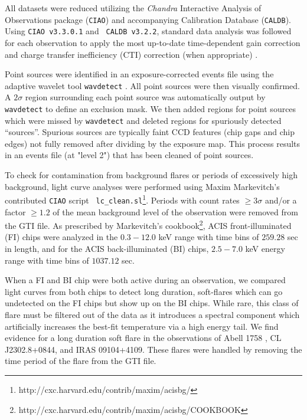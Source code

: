 \documentclass{emulateapj}
\begin{document}
All datasets were reduced utilizing the {\it Chandra} Interactive Analysis of
Observations package ({\tt CIAO}) and accompanying Calibration
Database ({\tt CALDB}). Using {\tt CIAO v3.3.0.1} and {\tt
CALDB v3.2.2}, standard data analysis was followed for each
observation to apply the most up-to-date time-dependent gain
correction and charge transfer inefficiency (CTI) correction (when
appropriate) \citep{2000ApJ...534L.139T}.

Point sources were identified in an exposure-corrected events file
using the adaptive wavelet tool {\tt wavdetect}
\citep{2002ApJS..138..185F}. All point sources were then visually
confirmed. A $2\sigma$ region surrounding each point source was
automatically output by {\tt wavdetect} to define an exclusion
mask. We then added regions for point sources which were missed by
{\tt wavdetect} and deleted regions for spuriously detected
``sources''. Spurious sources are typically faint CCD features (chip
gaps and chip edges) not fully removed after dividing by the exposure
map. This process results in an events file (at "level 2") that has
been cleaned of point sources.

To check for contamination from background flares or periods of
excessively high background, light curve analyses were performed using
Maxim Markevitch's contributed {\tt CIAO} script {\tt
lc\_clean.sl}\footnote{http://cxc.harvard.edu/contrib/maxim/acisbg/}.
Periods with count rates $\geq 3\sigma$ and/or a factor $\geq 1.2$ of
the mean background level of the observation were removed from the GTI
file. As prescribed by Markevitch's
cookbook\footnote{http://cxc.harvard.edu/contrib/maxim/acisbg/COOKBOOK},
ACIS front-illuminated (FI) chips were analyzed in the $0.3-12.0$ keV
range with time bins of $259.28$ sec in length, and for the ACIS
back-illuminated (BI) chips, $2.5-7.0$ keV energy range with time bins
of $1037.12$ sec.

When a FI and BI chip were both active during an observation, we
compared light curves from both chips to detect long duration,
soft-flares which can go undetected on the FI chips but show up on the
BI chips. While rare, this class of flare must be filtered out of the
data as it introduces a spectral component which artificially
increases the best-fit temperature via a high energy tail. We find
evidence for a long duration soft flare in the observations of Abell
1758 \citep{2004ApJ...613..831D}, CL J2302.8+0844, and IRAS
09104+4109. These flares were handled by removing the time period of
the flare from the GTI file.
\end{document}
